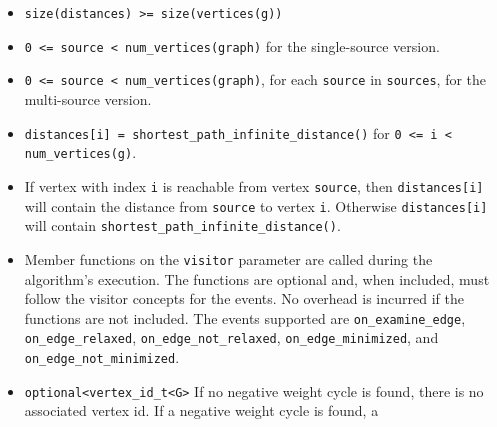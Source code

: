 \begin{itemdescr}
      \pnum\hardprecond
            \begin{itemize}
                  \item \lstinline{size(distances) >= size(vertices(g))}
                  \item
                        \lstinline{0 <= source < num_vertices(graph)} for the single-source version. 
                  \item
                        \lstinline{0 <= source < num_vertices(graph)}, for each \lstinline{source} in \lstinline{sources}, 
                                   for the multi-source version.
            \end{itemize}
      \pnum\preconditions
            \begin{itemize}
                  \item
                        \lstinline{distances[i] = shortest_path_infinite_distance()} for \lstinline{0 <= i < num_vertices(g)}.
            \end{itemize}
      \pnum\effects
            \begin{itemize}
                  \item
                        If vertex with index \lstinline{i} is reachable from vertex \lstinline{source}, then
                        \lstinline{distances[i]} will contain the distance from \lstinline{source} to vertex
                        \lstinline{i}.  Otherwise \lstinline{distances[i]} will contain
                        \lstinline{shortest_path_infinite_distance()}.
                  \item Member functions on the \lstinline{visitor} parameter are called during the algorithm's execution.
                        The functions are optional and, when included, must follow the visitor concepts for the events.
                        No overhead is incurred if the functions are not included.
                        The events supported are \lstinline{on_examine_edge}, \lstinline{on_edge_relaxed}, \lstinline{on_edge_not_relaxed},
                        \lstinline{on_edge_minimized}, and \lstinline{on_edge_not_minimized}.
            \end{itemize}
      \pnum\returns 
            \begin{itemize}
                  \item \lstinline{optional<vertex_id_t<G>} If no negative weight cycle is found, 
                        there is no associated vertex id. If a negative weight cycle is found, a

\end{itemize}
\end{itemdescr}
